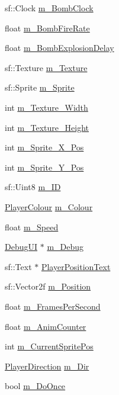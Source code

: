 \begin{DoxyCompactItemize}
\item 
sf\+::\+Clock \hyperlink{class_player_character_a8fa9ea765016a1b910ab7007f2071edb}{m\+\_\+\+Bomb\+Clock}
\item 
float \hyperlink{class_player_character_ad8ccf5c2e03d93085bacaf60f2801fb7}{m\+\_\+\+Bomb\+Fire\+Rate}
\item 
float \hyperlink{class_player_character_a1f8732b219730a15a1666ec77e690a71}{m\+\_\+\+Bomb\+Explosion\+Delay}
\item 
sf\+::\+Texture \hyperlink{class_player_character_a0536f6e9f31ba651a9e207d88227f7b9}{m\+\_\+\+Texture}
\item 
sf\+::\+Sprite \hyperlink{class_player_character_a65d271da64e077967d283b37396d1549}{m\+\_\+\+Sprite}
\item 
int \hyperlink{class_player_character_aa71fe75fed5e2e7da416b8073f9b37da}{m\+\_\+\+Texture\+\_\+\+Width}
\item 
int \hyperlink{class_player_character_a544274318c87093392e763ecaee909d6}{m\+\_\+\+Texture\+\_\+\+Height}
\item 
int \hyperlink{class_player_character_a8bf6864a7377ccafda31172a6e5b009d}{m\+\_\+\+Sprite\+\_\+\+X\+\_\+\+Pos}
\item 
int \hyperlink{class_player_character_aea5fde273dee8afe18af848cc7865b50}{m\+\_\+\+Sprite\+\_\+\+Y\+\_\+\+Pos}
\item 
sf\+::\+Uint8 \hyperlink{class_player_character_ab3ae00b8837356dd6bdb86d90a941cad}{m\+\_\+\+ID}
\item 
\hyperlink{_player_character_8h_a3fe9312ea357fba2db18ae32ffe5bca1}{Player\+Colour} \hyperlink{class_player_character_ab1d44ae0ba6b9067f771fb9bc15a5a3b}{m\+\_\+\+Colour}
\item 
float \hyperlink{class_player_character_af4dcd4c48904565edaad6274897991a8}{m\+\_\+\+Speed}
\item 
\hyperlink{class_debug_u_i}{Debug\+UI} $\ast$ \hyperlink{class_player_character_ad4c2a95040c945081107dd20d2634137}{m\+\_\+\+Debug}
\item 
sf\+::\+Text $\ast$ \hyperlink{class_player_character_afd9f0e8831f894c5e621543ed3ff3d9c}{Player\+Position\+Text}
\item 
sf\+::\+Vector2f \hyperlink{class_player_character_a551aaac5dacaebbde21c5b6d46f5ec7d}{m\+\_\+\+Position}
\item 
float \hyperlink{class_player_character_a45f3c61083c1db2753500d8e217ca463}{m\+\_\+\+Frames\+Per\+Second}
\item 
float \hyperlink{class_player_character_accc3a138e2f16b4fd7e07637fa00ef78}{m\+\_\+\+Anim\+Counter}
\item 
int \hyperlink{class_player_character_aef80914837c7107dd3e9b8315c913160}{m\+\_\+\+Current\+Sprite\+Pos}
\item 
\hyperlink{_player_character_8h_af5420be377752b383864a169dfd7ba10}{Player\+Direction} \hyperlink{class_player_character_ac2d756b41be615f4fa31cbb99d405109}{m\+\_\+\+Dir}
\item 
bool \hyperlink{class_player_character_a2c8e033c4db7139172041a4476ef1534}{m\+\_\+\+Do\+Once}
\end{DoxyCompactItemize}



